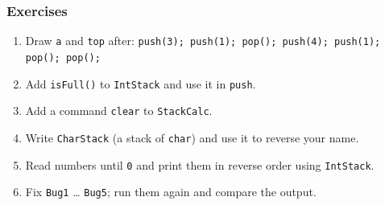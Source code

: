 \documentclass[aspectratio=169,10pt,compress]{beamer}
\begin{document}
\begin{frame}[t,fragile] \frametitle{Exercises}
  \begin{enumerate}\small
    \item Draw \texttt{a} and \texttt{top} after: \texttt{push(3); push(1); pop(); push(4); push(1); pop(); pop();}
    \item Add \texttt{isFull()} to \texttt{IntStack} and use it in \texttt{push}.
    \item Add a command \texttt{clear} to \texttt{StackCalc}.
    \item Write \texttt{CharStack} (a stack of \texttt{char}) and use it to reverse your name.
    \item Read numbers until \texttt{0} and print them in reverse order using \texttt{IntStack}.
    \item Fix \texttt{Bug1} \dots{} \texttt{Bug5}; run them again and compare the output.
  \end{enumerate}
\end{frame}




\begin{frame}[t,fragile]
	\begin{center}
		\vspace{4cm}
	\end{center}
\end{frame}
\end{document}
